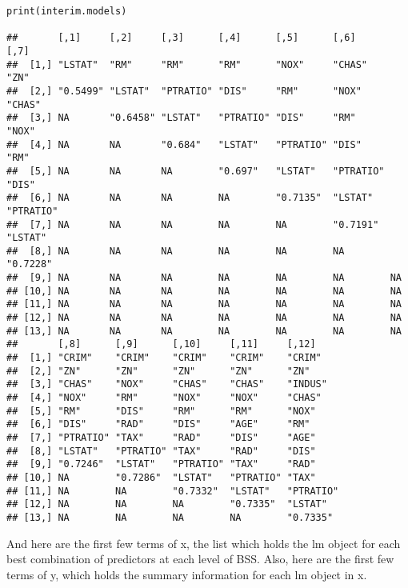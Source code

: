 \documentclass[]{article}
\begin{document}
\begin{verbatim}
print(interim.models) 

##       [,1]     [,2]     [,3]      [,4]      [,5]      [,6]      [,7]     
##  [1,] "LSTAT"  "RM"     "RM"      "RM"      "NOX"     "CHAS"    "ZN"     
##  [2,] "0.5499" "LSTAT"  "PTRATIO" "DIS"     "RM"      "NOX"     "CHAS"   
##  [3,] NA       "0.6458" "LSTAT"   "PTRATIO" "DIS"     "RM"      "NOX"    
##  [4,] NA       NA       "0.684"   "LSTAT"   "PTRATIO" "DIS"     "RM"     
##  [5,] NA       NA       NA        "0.697"   "LSTAT"   "PTRATIO" "DIS"    
##  [6,] NA       NA       NA        NA        "0.7135"  "LSTAT"   "PTRATIO"
##  [7,] NA       NA       NA        NA        NA        "0.7191"  "LSTAT"  
##  [8,] NA       NA       NA        NA        NA        NA        "0.7228" 
##  [9,] NA       NA       NA        NA        NA        NA        NA       
## [10,] NA       NA       NA        NA        NA        NA        NA       
## [11,] NA       NA       NA        NA        NA        NA        NA       
## [12,] NA       NA       NA        NA        NA        NA        NA       
## [13,] NA       NA       NA        NA        NA        NA        NA       
##       [,8]      [,9]      [,10]     [,11]     [,12]    
##  [1,] "CRIM"    "CRIM"    "CRIM"    "CRIM"    "CRIM"   
##  [2,] "ZN"      "ZN"      "ZN"      "ZN"      "ZN"     
##  [3,] "CHAS"    "NOX"     "CHAS"    "CHAS"    "INDUS"  
##  [4,] "NOX"     "RM"      "NOX"     "NOX"     "CHAS"   
##  [5,] "RM"      "DIS"     "RM"      "RM"      "NOX"    
##  [6,] "DIS"     "RAD"     "DIS"     "AGE"     "RM"     
##  [7,] "PTRATIO" "TAX"     "RAD"     "DIS"     "AGE"    
##  [8,] "LSTAT"   "PTRATIO" "TAX"     "RAD"     "DIS"    
##  [9,] "0.7246"  "LSTAT"   "PTRATIO" "TAX"     "RAD"    
## [10,] NA        "0.7286"  "LSTAT"   "PTRATIO" "TAX"    
## [11,] NA        NA        "0.7332"  "LSTAT"   "PTRATIO"
## [12,] NA        NA        NA        "0.7335"  "LSTAT"  
## [13,] NA        NA        NA        NA        "0.7335"
\end{verbatim}

And here are the first few terms of x, the list which holds the lm
object for each best combination of predictors at each level of BSS.
Also, here are the first few terms of y, which holds the summary
information for each lm object in x.
\end{document}
